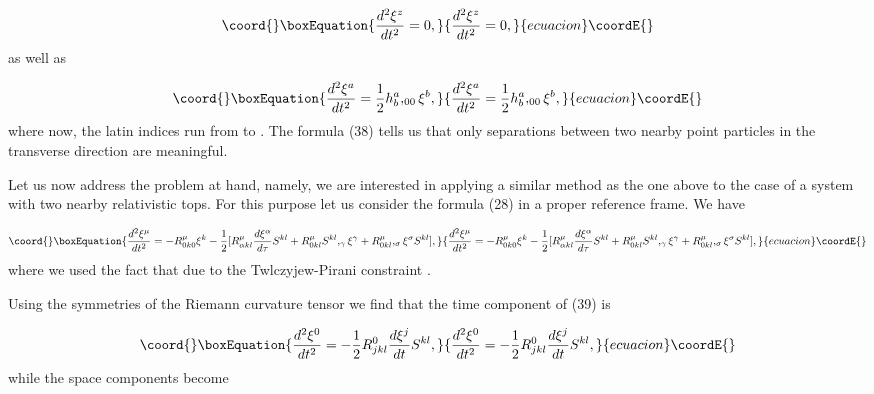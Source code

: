 \documentclass[a4paper,12pt]{article}
\begin{document}
\begin{equation}\coord{}\boxEquation{
\frac{d^{2}\xi ^{z}}{dt^{2}}=0,  \label{37}
}{
\frac{d^{2}\xi ^{z}}{dt^{2}}=0,  }{ecuacion}\coordE{}\end{equation}
as well as

\begin{equation}\coord{}\boxEquation{
\frac{d^{2}\xi ^{a}}{dt^{2}}=\frac{1}{2}h_{b}^{a},_{00}\xi ^{b},  \label{38}
}{
\frac{d^{2}\xi ^{a}}{dt^{2}}=\frac{1}{2}h_{b}^{a},_{00}\xi ^{b},  }{ecuacion}\coordE{}\end{equation}
where now, the latin indices \coordHE{} run from \coordHE{} to \coordHE{}. The formula
(38) tells us that only separations between two nearby point particles in
the transverse direction are meaningful.

Let us now address the problem at hand, namely, we are interested in
applying a similar method as the one above to the case of a system with two
nearby relativistic tops. For this purpose let us consider the formula (28)
in a proper reference frame. We have

\begin{equation}\coord{}\boxEquation{
\frac{d^{2}\xi ^{\mu }}{dt^{2}}=-R_{0k0}^{\mu }\xi ^{k}-\frac{1}{2}[
R_{\alpha kl}^{\mu }\frac{d\xi ^{\alpha }}{d\tau }S^{kl}+R_{0kl}^{\mu
}S^{kl},_{\gamma }\xi ^{\gamma }+R_{0kl}^{\mu },_{\sigma }\xi ^{\sigma
}S^{kl}],  \label{39}
}{
\frac{d^{2}\xi ^{\mu }}{dt^{2}}=-R_{0k0}^{\mu }\xi ^{k}-\frac{1}{2}[
R_{\alpha kl}^{\mu }\frac{d\xi ^{\alpha }}{d\tau }S^{kl}+R_{0kl}^{\mu
}S^{kl},_{\gamma }\xi ^{\gamma }+R_{0kl}^{\mu },_{\sigma }\xi ^{\sigma
}S^{kl}],  }{ecuacion}\coordE{}\end{equation}
where we used the fact that \coordHE{} due to the Twlczyjew-Pirani
constraint \coordHE{}.

Using the symmetries of the Riemann curvature tensor we find that the time
component of (39) is

\begin{equation}\coord{}\boxEquation{
\frac{d^{2}\xi^{0}}{dt^{2}}=-\frac{1}{2}R_{jkl}^{0}\frac{d\xi^{j}}{dt}S^{kl},
\label{40}
}{
\frac{d^{2}\xi^{0}}{dt^{2}}=-\frac{1}{2}R_{jkl}^{0}\frac{d\xi^{j}}{dt}S^{kl},
}{ecuacion}\coordE{}\end{equation}
while the space components become
\end{document}
